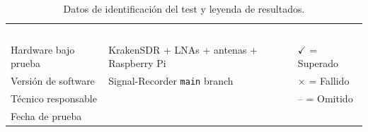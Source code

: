 \vspace{0.5cm}
\begin{table}[h]
    \centering
    \renewcommand{\arraystretch}{1.5}
    \begin{tabularx}{0.85\textwidth}{l X l}
        \rowcolor{deyposcolor}
        \textbf{\textcolor{white}{Campo}} & \textbf{\textcolor{white}{Detalle}} & \textbf{\textcolor{white}{Notación}} \\
        Hardware bajo prueba & KrakenSDR + LNAs + antenas + Raspberry Pi & \textcolor{green!60!black}{$\checkmark$} = Superado \\
        \rowcolor[gray]{0.95}
        Versión de software   & Signal-Recorder \texttt{main} branch       & $\times$ = Fallido  \\
        Técnico responsable   & \underline{\hspace{5cm}}                   & -- = Omitido        \\
        \rowcolor[gray]{0.95}
        Fecha de prueba       & \underline{\hspace{5cm}}                   &                     \\
        \bottomrule
    \end{tabularx}
    \caption{Datos de identificación del test y leyenda de resultados.}
\end{table}
\newpage